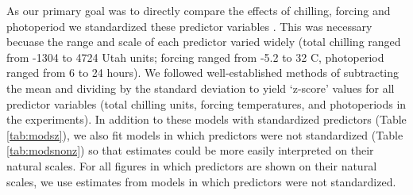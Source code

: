 \documentclass{article}
\begin{document}
\par As our primary goal was to directly compare the effects of chilling, forcing and photoperiod we standardized these predictor variables \citep{gelman2006}. This was necessary becuase the range and scale of each predictor varied widely (total chilling ranged from -1304 to 4724 Utah units; forcing ranged from -5.2 to 32 \degree C, photoperiod ranged from 6 to 24 hours). We followed well-established methods of subtracting the mean and dividing by the standard deviation \citep{gelman2006} to yield `z-score' values for all predictor variables (total chilling units, forcing temperatures, and photoperiods in the experiments).  In addition to these models with standardized predictors (Table \ref{tab:modsz}), we also fit models in which predictors were not standardized (Table \ref{tab:modsnonz}) so that estimates could be more easily interpreted on their natural scales. For all figures in which predictors are shown on their natural scales, we use estimates from models in which predictors were not standardized. 
\end{document}
